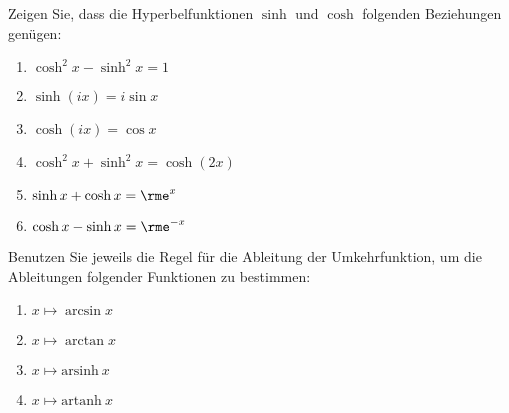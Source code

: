 
Zeigen Sie, dass die Hyperbelfunktionen $\sinh$ und $\cosh$ folgenden Beziehungen genügen:\\
\parbox{0.5\textwidth}{\begin{enumerate}
\item $\cosh^2 x-\sinh^2 x=1$
\item $\sinh (ix)=i\sin x$
\item $\cosh (ix)=\cos x$
\end{enumerate}}\parbox{0.5\textwidth}{\begin{enumerate}\setcounter{enumi}{3}
\item $\cosh^2 x+\sinh^2 x=\cosh (2x)$
\item $\sinh x+\cosh x=\rme^x$
\item $\cosh x-\sinh x=\rme^{-x}$
\end{enumerate}}




Benutzen Sie jeweils die Regel für die Ableitung der Umkehrfunktion, um die Ableitungen folgender Funktionen zu bestimmen:\\
\parbox{0.5\textwidth}{\begin{enumerate}
\item $x\mapsto\arcsin x$
\item $x\mapsto\arctan x$
\end{enumerate}}\parbox{0.5\textwidth}{\begin{enumerate}\setcounter{enumi}{2}
\item $x\mapsto \mathrm{arsinh}~x$
\item $x\mapsto \mathrm{artanh}~x$
\end{enumerate}}




